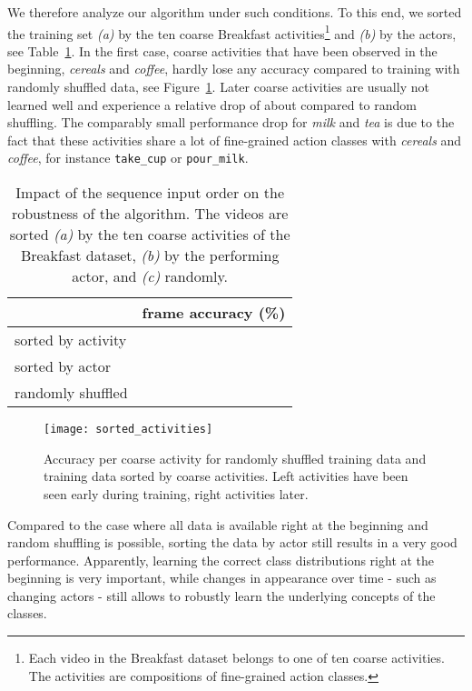 \documentclass[10pt,twocolumn,letterpaper]{article}
\begin{document}
We therefore analyze our algorithm under such conditions. To this end, we sorted the training set \textit{(a)} by the ten coarse Breakfast activities\footnote{Each video in the Breakfast dataset belongs to one of ten coarse activities. The activities are compositions of  fine-grained action classes.}
and \textit{(b)} by the actors, see Table~\ref{tab:inputOrder}.
In the first case, coarse activities that have been observed in the beginning, \eg \textit{cereals} and \textit{coffee},
hardly lose any accuracy compared to training with randomly shuffled data, see Figure~\ref{fig:sortedActivities}.
Later coarse activities are usually not learned well and experience a relative drop of about  compared to random shuffling.
The comparably small performance drop for \textit{milk} and \textit{tea} is due to the fact that
these activities share a lot of fine-grained action classes with \textit{cereals} and \textit{coffee},
for instance \texttt{take\_cup} or \texttt{pour\_milk}.

\begin{table}
    \footnotesize
    \begin{tabularx}{0.48\textwidth}{Xr}
        \toprule
                                & frame accuracy (\%) \\
        \midrule
            sorted by activity      &  \\
            sorted by actor         &  \\
            randomly shuffled       &  \\
        \bottomrule
    \end{tabularx}
    \caption{Impact of the sequence input order on the robustness of the algorithm.
             The videos are sorted \textit{(a)} by the ten coarse activities of the
             Breakfast dataset, \textit{(b)} by the performing actor, and \textit{(c)}
             randomly.}
    \label{tab:inputOrder}
\end{table}

\begin{figure}
    \centering
    \texttt{[image: sorted\_activities]}
    \caption{Accuracy per coarse activity for randomly shuffled training data and training data sorted
             by coarse activities. Left activities have been seen early during training, right activities later.}
    \label{fig:sortedActivities}
    \vspace{-0.3cm}
\end{figure}

Compared to the case where all data is available right at the beginning and random shuffling is
possible, sorting the data by actor still results in a very good performance. Apparently,
learning the correct class distributions right at the beginning is very important, while changes in appearance over time - such as changing actors - still allows to robustly learn the underlying concepts of the classes.
\end{document}
